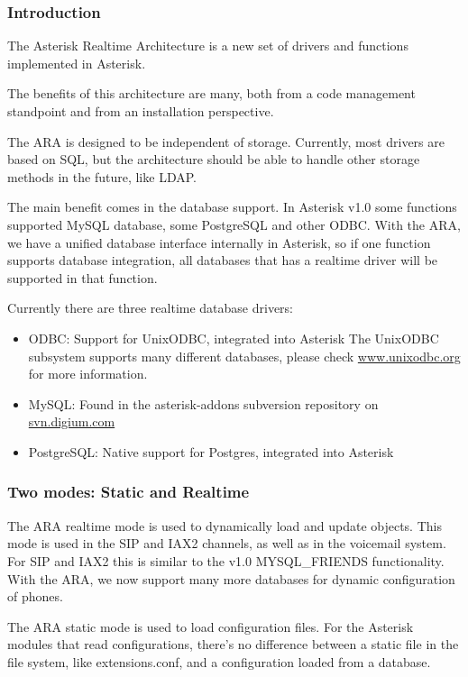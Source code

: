 \subsubsection{Introduction}

The Asterisk Realtime Architecture is a new set of drivers and
functions implemented in Asterisk.

The benefits of this architecture are many, both from a code management
standpoint and from an installation perspective.

The ARA is designed to be independent of storage. Currently, most
drivers are based on SQL, but the architecture should be able to handle
other storage methods in the future, like LDAP.

The main benefit comes in the database support. In Asterisk v1.0 some
functions supported MySQL database, some PostgreSQL and other ODBC.
With the ARA, we have a unified database interface internally in Asterisk,
so if one function supports database integration, all databases that has a
realtime driver will be supported in that function.

Currently there are three realtime database drivers:

\begin{itemize}
  \item ODBC: Support for UnixODBC, integrated into Asterisk
        The UnixODBC subsystem supports many different databases,
        please check \url{www.unixodbc.org} for more information.
  \item MySQL: Found in the asterisk-addons subversion repository on \url{svn.digium.com}
  \item PostgreSQL: Native support for Postgres, integrated into Asterisk
\end{itemize}

\subsubsection{Two modes: Static and Realtime}

The ARA realtime mode is used to dynamically load and update objects.
This mode is used in the SIP and IAX2 channels, as well as in the voicemail
system. For SIP and IAX2 this is similar to the v1.0 MYSQL\_FRIENDS
functionality. With the ARA, we now support many more databases for
dynamic configuration of phones.

The ARA static mode is used to load configuration files. For the Asterisk
modules that read configurations, there's no difference between a static
file in the file system, like extensions.conf, and a configuration loaded
from a database.

